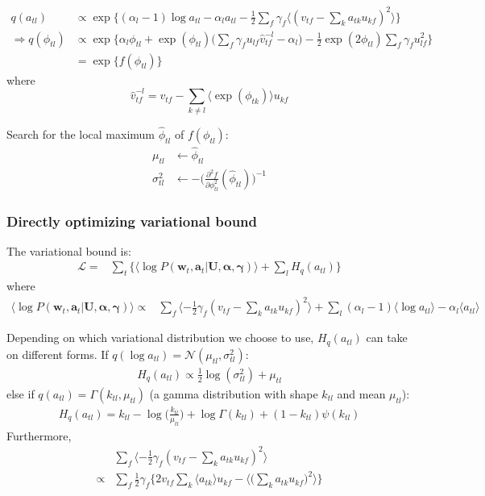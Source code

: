 \documentclass{article}
\begin{document}
\begin{align*}
q(a_{tl}) &\propto \exp \{ (\alpha_l - 1) \log a_{tl} - \alpha_l a_{tl} - \frac{1}{2} \sum_f \gamma_f  \langle (v_{tf} - \sum_k a_{tk} u_{kf})^2 \rangle \}\\
\Rightarrow q(\phi_{tl}) &\propto \exp \biggl\{ \alpha_l  \phi_{tl}  + \exp(\phi_{tl}) \biggl(\sum_f \gamma_f u_{lf} \hat{v}_{tf}^{-l} - \alpha_l\biggl) - \frac{1}{2} \exp(2\phi_{tl}) \sum_f \gamma_f u_{lf}^2  \biggl\}\\
&= \exp\{f(\phi_{tl})\}
\end{align*}
where 
\[
\hat{v}_{tf}^{-l} = v_{tf} - \sum_{k\neq l} \langle \exp(\phi_{tk})\rangle u_{kf}
\]

Search for the local maximum $\hat{\phi}_{tl}$ of $f(\phi_{tl})$:
\begin{align*}
\mu_{tl} &\leftarrow \hat{\phi}_{tl}\\
\sigma_{tl}^2 & \leftarrow -\biggl(\frac{\partial^2 f } {\partial \phi_{tl}^2} (\hat{\phi}_{tl})\biggl)^{-1}
\end{align*}

\subsubsection{Directly optimizing variational bound}

 The variational bound is:
\begin{align*}
\mathcal{L}=& \sum_t \biggl\{  \langle \log P(\bm{w}_t, \bm{a}_t | \mathbf{U}, \bm{\alpha}, \bm{\gamma}) \rangle + \sum_l H_q (a_{tl}) \biggl\}
\end{align*}
where
\begin{align*}
 \langle \log P(\bm{w}_t, \bm{a}_t | \mathbf{U}, \bm{\alpha}, \bm{\gamma}) \rangle  \propto & \sum_f \langle -\frac{1}{2} \gamma_f (v_{tf} - \sum_k a_{tk} u_{kf})^2 \rangle + \sum_l  (\alpha_l - 1) \langle \log a_{tl} \rangle - \alpha_l \langle a_{tl} \rangle
\end{align*}

Depending on which variational distribution we choose to use, $H_q(a_{tl})$ can take on different forms. If $q(\log a_{tl}) = \mathcal{N}(\mu_{tl}, \sigma_{tl}^2)$: 
\begin{align*}
H_q (a_{tl}) \propto \frac{1}{2}\log ( \sigma_{tl}^2) + \mu_{tl}
\end{align*}
else if $q(a_{tl}) = \Gamma(k_{tl}, \mu_{tl})$ (a gamma distribution with shape $k_{tl}$ and mean $\mu_{tl}$):
\begin{align*}
H_q (a_{tl}) = k_{tl} - \log \biggl(\frac{k_{tl}}{\mu_{tl}}\biggl) + \log \Gamma(k_{tl}) + (1 - k_{tl})\psi(k_{tl})
\end{align*}
Furthermore,
\begin{align*}
& \sum_f \langle -\frac{1}{2} \gamma_f (v_{tf} - \sum_k a_{tk} u_{kf})^2 \rangle \\
\propto & \sum_f \frac{1}{2} \gamma_f \biggl\{ 2 v_{tf} \sum_k \langle a_{tk} \rangle u_{kf} -  \langle \big(\sum_k a_{tk} u_{kf}\big)^2 \rangle \biggl\}
\end{align*}
\end{document}
